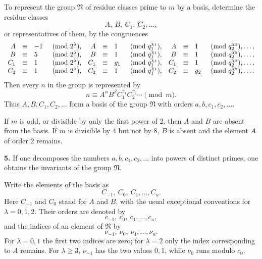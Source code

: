 \documentclass[11pt]{article}
\providecommand{\grpN}{\mathfrak N}
\begin{document}
To represent the group $\grpN$ of residue classes prime to $m$ by a basis, determine the residue classes
\begin{equation}
 A,\ B,\ C_1,\ C_2,
\ldots,
\tag{2}
\end{equation}
or representatives of them, by the congruences
\[
\begin{array}{rcll@{\quad}rcll@{\quad}rcll}
A&\equiv&-1&\pmod {2^\lambda},& A&\equiv&1&\pmod {q_1^{\chi_1}},&A&\equiv&1&\pmod {q_2^{\chi_2}},\ldots,\\
B&\equiv&5&\pmod {2^\lambda},& B&\equiv&1&\pmod {q_1^{\chi_1}},&B&\equiv&1&\pmod {q_2^{\chi_2}},\ldots,\\
C_1&\equiv&1&\pmod {2^\lambda},&C_1&\equiv&g_1&\pmod {q_1^{\chi_1}},&C_1&\equiv&1&\pmod {q_2^{\chi_2}},\ldots,\\
C_2&\equiv&1&\pmod {2^\lambda},&C_2&\equiv&1&\pmod {q_1^{\chi_1}},&C_2&\equiv&g_2&\pmod {q_2^{\chi_2}},\ldots.
\end{array}
\]
Then every $n$ in the group is represented by
\begin{equation}
 n\equiv A^\alpha B^\beta C_1^{\gamma_1}C_2^{\gamma_2}\cdots\pmod m .
\tag{3}
\end{equation}
Thus $A,B,C_1,C_2,
\ldots$ form a basis of the group $\grpN$ with orders $a,b,c_1,c_2,
\ldots$.

If $m$ is odd, or divisible by only the first power of $2$, then $A$ and $B$ are absent from the basis. If $m$ is divisible by $4$ but not by $8$, $B$ is absent and the element $A$ of order $2$ remains.

\medskip
\noindent\textbf{5.} If one decomposes the numbers $a,b,c_1,c_2,
\ldots$ into powers of distinct primes, one obtains the invariants of the group $\grpN$.

Write the elements of the basis as
\begin{equation}
 C_{-1},\ C_0,\ C_1,
\ldots,C_u.
\tag{4}
\end{equation}
Here $C_{-1}$ and $C_0$ stand for $A$ and $B$, with the usual exceptional conventions for $\lambda=0,1,2$. Their orders are denoted by
\begin{equation}
 c_{-1},\ c_0,\ c_1,
\ldots,c_u,
\tag{5}
\end{equation}
and the indices of an element of $\grpN$ by
\begin{equation}
 \nu_{-1},\ \nu_0,\ \nu_1,
\ldots,\nu_u.
\tag{6}
\end{equation}
For $\lambda=0,1$ the first two indices are zero; for $\lambda=2$ only the index corresponding to $A$ remains. For $\lambda\ge3$, $\nu_{-1}$ has the two values $0,1$, while $\nu_0$ runs modulo $c_0$.
\end{document}
